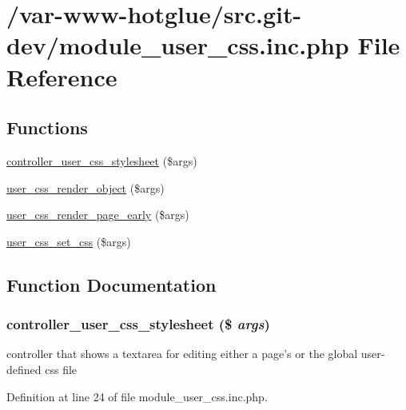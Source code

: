 \hypertarget{module__user__css_8inc_8php}{
\section{/var-\/www-\/hotglue/src.git-\/dev/module\_\-user\_\-css.inc.php File Reference}
\label{module__user__css_8inc_8php}
}
\subsection*{Functions}
\begin{DoxyCompactItemize}
\item 
\hyperlink{module__user__css_8inc_8php_a572226d9a006e84533980340eddbcdea}{controller\_\-user\_\-css\_\-stylesheet} (\$args)
\item 
\hyperlink{module__user__css_8inc_8php_ab26eaefed01451501b96acf67fbd9401}{user\_\-css\_\-render\_\-object} (\$args)
\item 
\hyperlink{module__user__css_8inc_8php_af0bd5e1927965e4cd775bfb30d510ac1}{user\_\-css\_\-render\_\-page\_\-early} (\$args)
\item 
\hyperlink{module__user__css_8inc_8php_a568a25309a9a2419076775fd77dbdfda}{user\_\-css\_\-set\_\-css} (\$args)
\end{DoxyCompactItemize}


\subsection{Function Documentation}
\hypertarget{module__user__css_8inc_8php_a572226d9a006e84533980340eddbcdea}{
\subsubsection[{controller\_\-user\_\-css\_\-stylesheet}]{\setlength{\rightskip}{0pt plus 5cm}controller\_\-user\_\-css\_\-stylesheet (\$ {\em args})}}
\label{module__user__css_8inc_8php_a572226d9a006e84533980340eddbcdea}
controller that shows a textarea for editing either a page's or the global user-\/defined css file 

Definition at line 24 of file module\_\-user\_\-css.inc.php.

